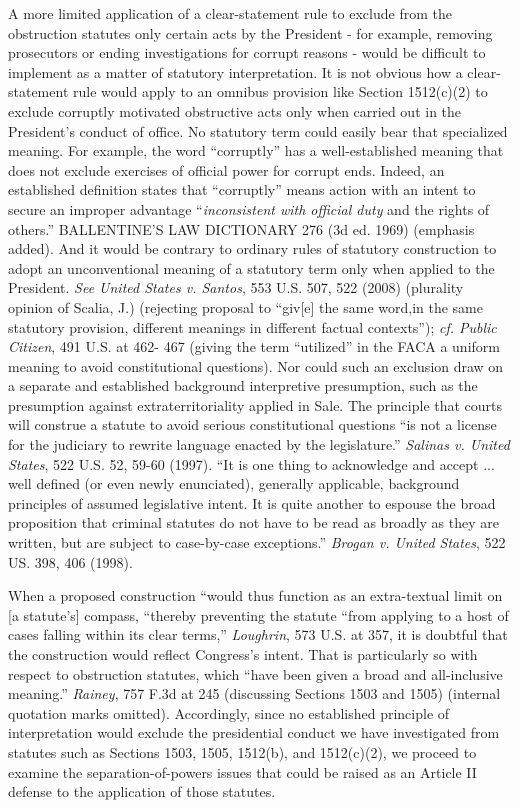 A more limited application of a clear-statement rule to exclude from the obstruction statutes only certain acts by the President - for example, removing prosecutors or ending investigations for corrupt reasons - would be difficult to implement as a matter of statutory interpretation.
It is not obvious how a clear-statement rule would apply to an omnibus provision like Section 1512(c)(2) to exclude corruptly motivated obstructive acts only when carried out in the President’s conduct of office.
No statutory term could easily bear that specialized meaning.
For example, the word “corruptly” has a well-established meaning that does not exclude exercises of official power for corrupt ends.
Indeed, an established definition states that “corruptly” means action with an intent to secure an improper advantage “\textit{inconsistent with official duty} and the rights of others.”
BALLENTINE’S LAW DICTIONARY 276 (3d ed. 1969) (emphasis added).
And it would be contrary to ordinary rules of statutory construction to adopt an unconventional meaning of a statutory term only when applied to the President.
\textit{See United States v. Santos}, 553 U.S. 507, 522 (2008) (plurality opinion of Scalia, J.) (rejecting proposal to “giv[e] the same word,in the same statutory provision, different meanings in different factual contexts”);
\textit{cf. Public Citizen}, 491 U.S. at 462- 467 (giving the term “utilized” in the FACA a uniform meaning to avoid constitutional questions).
Nor could such an exclusion draw on a separate and established background interpretive presumption, such as the presumption against extraterritoriality applied in Sale.
The principle that courts will construe a statute to avoid serious constitutional questions “is not a license for the judiciary to rewrite language enacted by the legislature.”
\textit{Salinas v. United States}, 522 U.S. 52, 59-60 (1997).
“It is one thing to acknowledge and accept ... well defined (or even newly enunciated), generally applicable, background principles of assumed legislative intent.
It is quite another to espouse the broad proposition that criminal statutes do not have to be read as broadly as they are written, but are subject to case-by-case exceptions.”
\textit{Brogan v. United States}, 522 US. 398, 406 (1998).

When a proposed construction “would thus function as an extra-textual limit on [a statute’s] compass, “thereby preventing the statute “from applying to a host of cases falling within its clear terms,” \textit{Loughrin}, 573 U.S. at 357, it is doubtful that the construction would reflect Congress’s intent.
That is particularly so with respect to obstruction statutes, which “have been given a broad and all-inclusive meaning.”
\textit{Rainey}, 757 F.3d at 245 (discussing Sections 1503 and 1505) (internal quotation marks omitted).
Accordingly, since no established principle of interpretation would exclude the presidential conduct we have investigated from statutes such as Sections 1503, 1505, 1512(b), and 1512(c)(2), we proceed to examine the separation-of-powers issues that could be raised as an Article II defense to the application of those statutes.


